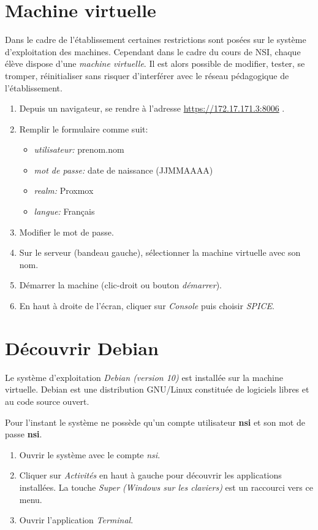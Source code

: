 \documentclass[a4paper,11pt]{article}
\begin{document}
\section{Machine virtuelle}
Dans le cadre de l'établissement certaines restrictions sont posées sur le système d'exploitation des machines. Cependant dans le cadre du cours de NSI, chaque élève dispose d'une \emph{machine virtuelle}. Il est alors possible de modifier, tester, se tromper, réinitialiser sans risquer d'interférer avec le réseau pédagogique de l'établissement.
\begin{activite}
    \begin{enumerate}
        \item Depuis un navigateur, se rendre à l'adresse \url{https://172.17.171.3:8006} .
        \item Remplir le formulaire comme suit:
              \begin{itemize}
                  \item \emph{utilisateur:} prenom.nom
                  \item \emph{mot de passe:} date de naissance (JJMMAAAA)
                  \item \emph{realm:} Proxmox
                  \item \emph{langue:} Français
              \end{itemize}
        \item Modifier le mot de passe.
        \item Sur le serveur (bandeau gauche), sélectionner la machine virtuelle avec son nom.
        \item Démarrer la machine (clic-droit ou bouton \emph{démarrer}).
        \item En haut à droite de l'écran, cliquer sur \emph{Console} puis choisir \emph{SPICE}.
    \end{enumerate}
\end{activite}
\section{Découvrir Debian}
Le système d'exploitation \emph{Debian (version 10)} est installée sur la machine virtuelle. Debian est une distribution GNU/Linux constituée de logiciels libres et au code source ouvert.

Pour l'instant le système ne possède qu'un compte utilisateur \textbf{nsi} et son mot de passe \textbf{nsi}.
\begin{activite}
    \begin{enumerate}
        \item Ouvrir le système avec le compte \emph{nsi}.
        \item Cliquer sur \emph{Activités} en haut à gauche pour découvrir les applications installées. La touche \emph{Super (Windows sur les claviers)} est un raccourci vers ce menu.
        \item Ouvrir l'application \emph{Terminal}.
    \end{enumerate}
\end{activite}
\end{document}
